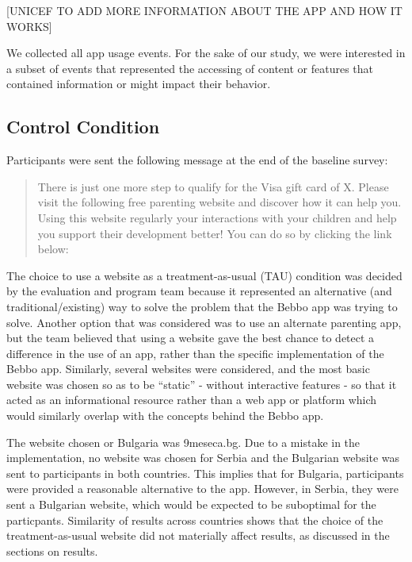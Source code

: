 \documentclass{article}
\begin{document}
[UNICEF TO ADD MORE INFORMATION ABOUT THE APP AND HOW IT WORKS]

We collected all app usage events. For the sake of our study, we were interested in a subset of events that represented the accessing of content or features that contained information or might impact their behavior.


\subsection*{Control Condition}

Participants were sent the following message at the end of the baseline survey:

\begin{quote}

There is just one more step to qualify for the Visa gift card of X. Please visit the following free parenting website and discover how it can help you. Using this website regularly  your interactions with your children and help you support their development better! You can do so by clicking the link below:
\end{quote}

The choice to use a website as a treatment-as-usual (TAU) condition was decided by the evaluation and program team because it represented an alternative (and traditional/existing) way to solve the problem that the Bebbo app was trying to solve. Another option that was considered was to use an alternate parenting app, but the team believed that using a website gave the best chance to detect a difference in the use of an app, rather than the specific implementation of the Bebbo app. Similarly, several websites were considered, and the most basic website was chosen so as to be ``static'' - without interactive features - so that it acted as an informational resource rather than a web app or platform which would similarly overlap with the concepts behind the Bebbo app.

The website chosen or Bulgaria was 9meseca.bg. Due to a mistake in the implementation, no website was chosen for Serbia and the Bulgarian website was sent to participants in both countries. This implies that for Bulgaria, participants were provided a reasonable alternative to the app. However, in Serbia, they were sent a Bulgarian website, which would be expected to be suboptimal for the particpants. Similarity of results across countries shows that the choice of the treatment-as-usual website did not materially affect results, as discussed in the sections on results.
\end{document}
